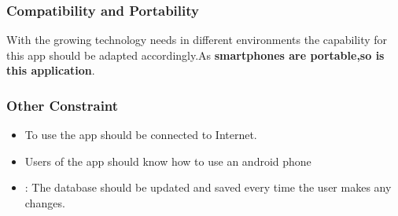 \documentclass{article}
\begin{document}
\subsubsection{Compatibility and Portability}
With the growing technology needs in different environments the capability for this app should be adapted accordingly.As \textbf{smartphones are portable,so is this application}.

\subsubsection{Other Constraint}
\begin{itemize}
    \item To use the app should be connected to Internet.\\
    \item Users of the app should know how to use an android phone\\
    \item: The database should be updated and saved every time the user makes any changes.
\end{itemize}
\end{document}
